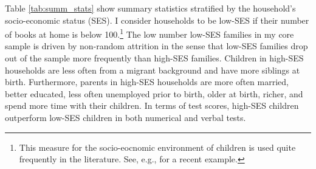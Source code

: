 Table \ref{tab:summ_stats} show summary statistics stratified by the household's socio-economic status (SES). I consider households to be low-SES if their number of books at home is below 100.\footnote{
This measure for the socio-eocnomic environment of children is used quite frequently in the literature. See, e.g., \textcite{resnjanskij et al} for a recent example.
} The low number low-SES families in my core sample is driven by non-random attrition in the sense that low-SES families drop out of the sample more frequently than high-SES families. Children in high-SES households are less often from a migrant background and have more siblings at birth. Furthermore, parents in high-SES households are more often married, better educated, less often unemployed prior to birth, older at birth, richer, and spend more time with their children. In terms of test scores, high-SES children outperform low-SES children in both numerical and verbal tests.

